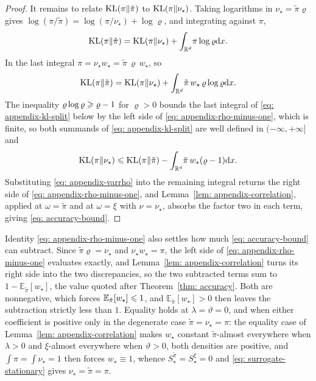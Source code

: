 \documentclass{article}
\begin{document}
\begin{proof}
It remains to relate $\mathrm{KL}(\pi\|\tilde\pi)$ to $\mathrm{KL}(\pi\|\nu_\star)$. Taking logarithms in $\nu_\star=\tilde\pi\varrho$ gives $\log(\pi/\tilde\pi) = \log(\pi/\nu_\star) + \log\varrho$, and integrating against $\pi$,
\begin{equation*}
	\mathrm{KL}(\pi\|\tilde\pi) = \mathrm{KL}(\pi\|\nu_\star) + \int_{\mathbb R^d}\!\pi\log\varrho\mathrm{d} x .
\end{equation*}
In the last integral $\pi = \nu_\star w_\star = \tilde\pi\,\varrho\,w_\star$, so
\begin{equation}
    \mathrm{KL}(\pi\|\tilde\pi) = \mathrm{KL}(\pi\|\nu_\star) + \int_{\mathbb R^d}\!\tilde\pi\,w_\star\,\varrho\log\varrho\mathrm{d} x .
    \label{eq: appendix-kl-split}
\end{equation}
The inequality $\varrho\log\varrho\geqslant\varrho-1$ for $\varrho>0$ bounds the last integral of \eqref{eq: appendix-kl-split} below by the left side of \eqref{eq: appendix-rho-minus-one}, which is finite, so both summands of \eqref{eq: appendix-kl-split} are well defined in $(-\infty,+\infty]$ and
\begin{equation*}
    \mathrm{KL}(\pi\|\nu_\star) \leqslant \mathrm{KL}(\pi\|\tilde\pi) - \int_{\mathbb R^d}\!\tilde\pi\,w_\star(\varrho-1)\mathrm{d} x.
\end{equation*}
Substituting \eqref{eq: appendix-varrho} into the remaining integral returns the right side of \eqref{eq: appendix-rho-minus-one}, and Lemma~\ref{lem: appendix-correlation}, applied at $\omega=\tilde\pi$ and at $\omega=\xi$ with $\nu=\nu_\star$, absorbs the factor two in each term, giving \eqref{eq: accuracy-bound}.
\end{proof}

Identity \eqref{eq: appendix-rho-minus-one} also settles how much \eqref{eq: accuracy-bound} can subtract. Since $\tilde\pi\varrho=\nu_\star$ and $\nu_\star w_\star=\pi$, the left side of \eqref{eq: appendix-rho-minus-one} evaluates exactly, and Lemma~\ref{lem: appendix-correlation} turns its right side into the two discrepancies, so the two subtracted terms sum to $1-\mathbb E_{\tilde\pi}[w_\star]$, the value quoted after Theorem~\ref{thm: accuracy}. Both are nonnegative, which forces $\mathbb E_{\tilde\pi}[w_\star]\leqslant1$, and $\mathbb E_{\tilde\pi}[w_\star]>0$ then leaves the subtraction strictly less than $1$. Equality holds at $\lambda=\vartheta=0$, and when either coefficient is positive only in the degenerate case $\tilde\pi=\nu_\star=\pi$: the equality case of Lemma~\ref{lem: appendix-correlation} makes $w_\star$ constant $\tilde\pi$-almost everywhere when $\lambda>0$ and $\xi$-almost everywhere when $\vartheta>0$, both densities are positive, and $\int\pi=\int\nu_\star=1$ then forces $w_\star\equiv1$, whence $S^{\tilde\pi}_\star=S^{\xi}_\star=0$ and \eqref{eq: surrogate-stationary} gives $\nu_\star=\tilde\pi=\pi$.
\end{document}

